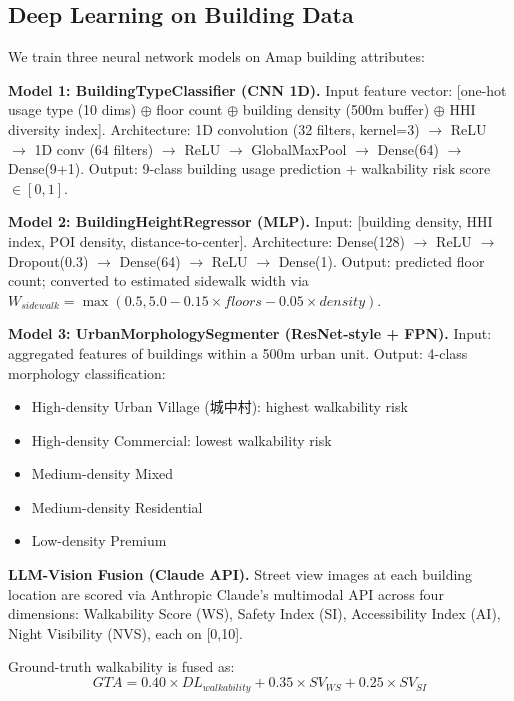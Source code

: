\documentclass[journal]{IEEEtran}
\begin{document}
\subsection{Deep Learning on Building Data}
We train three neural network models on Amap building attributes:

\textbf{Model 1: BuildingTypeClassifier (CNN 1D).} Input feature vector: [one-hot usage type (10 dims) $\oplus$ floor count $\oplus$ building density (500m buffer) $\oplus$ HHI diversity index]. Architecture: 1D convolution (32 filters, kernel=3) $\rightarrow$ ReLU $\rightarrow$ 1D conv (64 filters) $\rightarrow$ ReLU $\rightarrow$ GlobalMaxPool $\rightarrow$ Dense(64) $\rightarrow$ Dense(9+1). Output: 9-class building usage prediction + walkability risk score $\in [0,1]$.

\textbf{Model 2: BuildingHeightRegressor (MLP).} Input: [building density, HHI index, POI density, distance-to-center]. Architecture: Dense(128) $\rightarrow$ ReLU $\rightarrow$ Dropout(0.3) $\rightarrow$ Dense(64) $\rightarrow$ ReLU $\rightarrow$ Dense(1). Output: predicted floor count; converted to estimated sidewalk width via $W_{sidewalk} = \max(0.5, 5.0 - 0.15 \times floors - 0.05 \times density)$.

\textbf{Model 3: UrbanMorphologySegmenter (ResNet-style + FPN).} Input: aggregated features of buildings within a 500m urban unit. Output: 4-class morphology classification:
\begin{itemize}
    \itemsep0pt
    \item High-density Urban Village (城中村): highest walkability risk
    \item High-density Commercial: lowest walkability risk
    \item Medium-density Mixed
    \item Medium-density Residential
    \item Low-density Premium
\end{itemize}

\textbf{LLM-Vision Fusion (Claude API).} Street view images at each building location are scored via Anthropic Claude's multimodal API across four dimensions: Walkability Score (WS), Safety Index (SI), Accessibility Index (AI), Night Visibility (NVS), each on [0,10].

Ground-truth walkability is fused as:
\begin{equation}
\label{eq:gta}
GTA = 0.40 \times DL_{walkability} + 0.35 \times SV_{WS} + 0.25 \times SV_{SI}
\end{equation}
\end{document}
